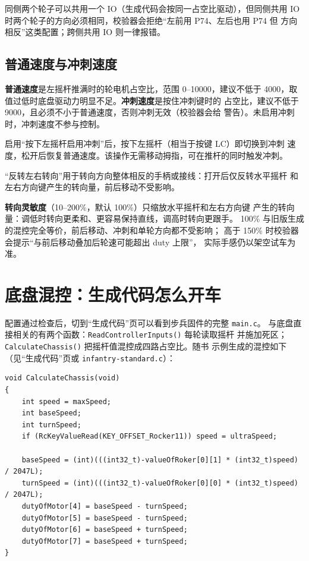同侧两个轮子可以共用一个 IO（生成代码会按同一占空比驱动），但同侧共用
IO 时两个轮子的方向必须相同，校验器会拒绝“左前用 P74、左后也用 P74 但
方向相反”这类配置；跨侧共用 IO 则一律报错。

\subsection{普通速度与冲刺速度}

\textbf{普通速度}是左摇杆推满时的轮电机占空比，范围 0--10000，建议不低于
4000，取值过低时底盘驱动力明显不足。\textbf{冲刺速度}是按住冲刺键时的
占空比，建议不低于 9000，且必须不小于普通速度，否则冲刺无效（校验器会给
警告）。未启用冲刺时，冲刺速度不参与控制。

启用“按下左摇杆启用冲刺”后，按下左摇杆（相当于按键 LC）即切换到冲刺
速度，松开后恢复普通速度。该操作无需移动拇指，可在推杆的同时触发冲刺。

“反转左右转向”用于转向方向整体相反的手柄或接线：打开后仅反转水平摇杆
和左右方向键产生的转向量，前后移动不受影响。

\textbf{转向灵敏度}（10--200\%，默认 100\%）只缩放水平摇杆和左右方向键
产生的转向量：调低时转向更柔和、更容易保持直线，调高时转向更跟手。
100\% 与旧版生成的混控完全等价，前后移动、冲刺和单轮方向都不受影响；
高于 150\% 时校验器会提示“与前后移动叠加后轮速可能超出 duty 上限”，
实际手感仍以架空试车为准。

\section{底盘混控：生成代码怎么开车}

配置通过检查后，切到“生成代码”页可以看到步兵固件的完整 \texttt{main.c}。
与底盘直接相关的有两个函数：\texttt{ReadControllerInputs()} 每轮读取摇杆
并施加死区；\texttt{CalculateChassis()} 把摇杆值混控成四路占空比。随书
示例生成的混控如下（见“生成代码”页或 \texttt{infantry-standard.c}）：

\begin{lstlisting}[style=pieblockc,
  caption={随书示例生成的底盘混控（节选）：先算平移与转向量，再按单轮方向合成},
  label={lst:ch03-chassis}]
void CalculateChassis(void)
{
    int speed = maxSpeed;
    int baseSpeed;
    int turnSpeed;
    if (RcKeyValueRead(KEY_OFFSET_Rocker11)) speed = ultraSpeed;

    baseSpeed = (int)(((int32_t)-valueOfRoker[0][1] * (int32_t)speed) / 2047L);
    turnSpeed = (int)(((int32_t)-valueOfRoker[0][0] * (int32_t)speed) / 2047L);
    dutyOfMotor[4] = baseSpeed - turnSpeed;
    dutyOfMotor[5] = baseSpeed - turnSpeed;
    dutyOfMotor[6] = baseSpeed + turnSpeed;
    dutyOfMotor[7] = baseSpeed + turnSpeed;
}
\end{lstlisting}


